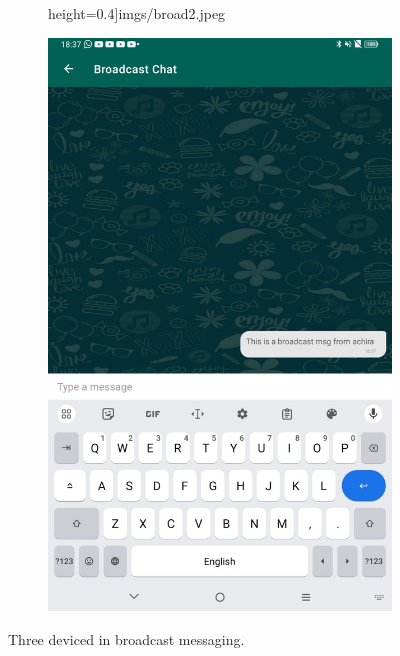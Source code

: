 \begin{figure}
\begin{subfigure}[b]{0.3\textwidth}
            height=0.4\textheight]{imgs/broad2.jpeg}
        \label{broad:2}
    \end{subfigure}
    \hspace{1cm}
    \begin{subfigure}[b]{0.4\textwidth}
        \includegraphics[width=\textwidth,
            height=0.4\textheight]{imgs/broad3.jpeg}
        \label{broad:3}
    \end{subfigure}
    \caption{Three deviced in broadcast messaging.}
    \label{broad}
\end{figure}

